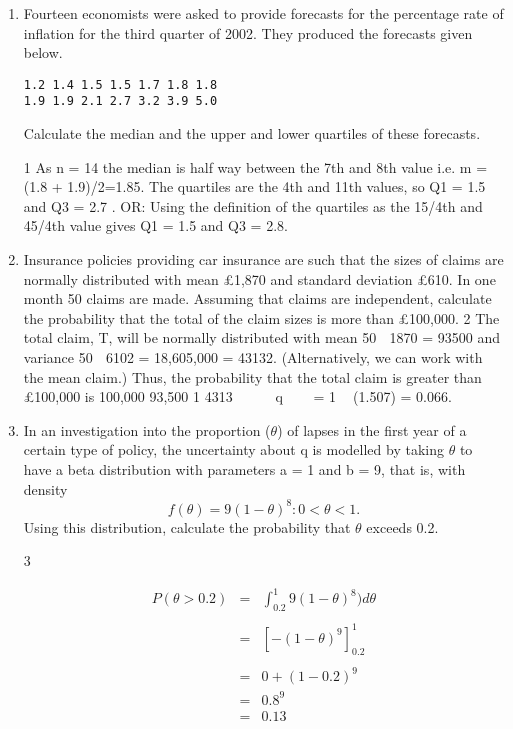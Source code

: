 \documentclass[a4paper,12pt]{article}
\begin{document}
\begin{enumerate}
\item  Fourteen economists were asked to provide forecasts for the percentage rate
of inflation for the third quarter of 2002. They produced the forecasts given
below.
\begin{verbatim}
1.2 1.4 1.5 1.5 1.7 1.8 1.8
1.9 1.9 2.1 2.7 3.2 3.9 5.0    
\end{verbatim}

Calculate the median and the upper and lower quartiles of these forecasts. 

1 As n = 14 the median is half way between the 7th and 8th value
i.e. m = (1.8 + 1.9)/2=1.85.
The quartiles are the 4th and 11th values, so Q1 = 1.5 and Q3 = 2.7 .
OR: Using the definition of the quartiles as the 15/4th and 45/4th value gives
Q1 = 1.5 and Q3 = 2.8.
\newpage
\item Insurance policies providing car insurance are such that the sizes of claims are
normally distributed with mean £1,870 and standard deviation £610. In one
month 50 claims are made. Assuming that claims are independent, calculate
the probability that the total of the claim sizes is more than £100,000. 
2 The total claim, T, will be normally distributed with mean 50  1870 = 93500
and variance 50  6102 = 18,605,000 = 43132.
(Alternatively, we can work with the mean claim.)
Thus, the probability that the total claim is greater than £100,000 is
100,000 93,500
1
4313
  
 q 
 
= 1  (1.507) = 0.066.
\newpage
\item  In an investigation into the proportion ($\theta$) of lapses in the first year of a
certain type of policy, the uncertainty about q is modelled by taking $\theta$ to have a
beta distribution with parameters a = 1 and b = 9, that is, with density
\[f(\theta) = 9(1 - \theta)^8 : 0 < \theta < 1.\]
Using this distribution, calculate the probability that $\theta$ exceeds 0.2. 


3

\begin{eqnarray*}
P(\theta > 0.2) &=& \int^{1}_{0.2} 9(1- \theta)^8) d \theta \\
& & \\
&=& \left[ -(1-\theta)^9  \right]^{1}_{0.2}\\
& & \\
&=& 0 + (1 - 0.2)^9 \\ 
&=& 0.8^9 \\
&=& 0.13\\
\end{eqnarray*}



\end{enumerate}
\end{document}

